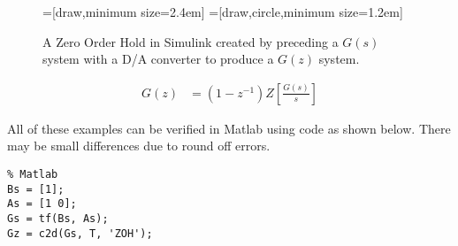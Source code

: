 \documentclass{article}
\newcommand{\sincludepdf}[2][]{
	
}
\begin{document}
\begin{figure}
\begin{center}
=[draw,minimum size=2.4em]
=[draw,circle,minimum size=1.2em]
\end{center}

\caption{A Zero Order Hold in Simulink created by preceding
a $G(s)$ system with a D/A converter to produce a $G(z)$ system.}
\label{fig:simulinkzoh}
\end{figure}

\begin{align}
	G(z) &= (1 - z^{-1}) Z \left[ \frac{G(s)}{s} \right]
\end{align}

All of these examples can be verified in Matlab using
code as shown below.
There may be small differences due to round off errors.

\begin{lstlisting}
% Matlab
Bs = [1];
As = [1 0];
Gs = tf(Bs, As);
Gz = c2d(Gs, T, 'ZOH');
\end{lstlisting}

\sincludepdf[pages={8},
			pagecommand=\subsection*{Example 1}
	]{scan/11211301.pdf}

\sincludepdf[pages={6},
			pagecommand=\subsection*{Example 2}
		]{scan/11221301.pdf}
\sincludepdf[pages={7}]{scan/11221301.pdf}
\end{document}

